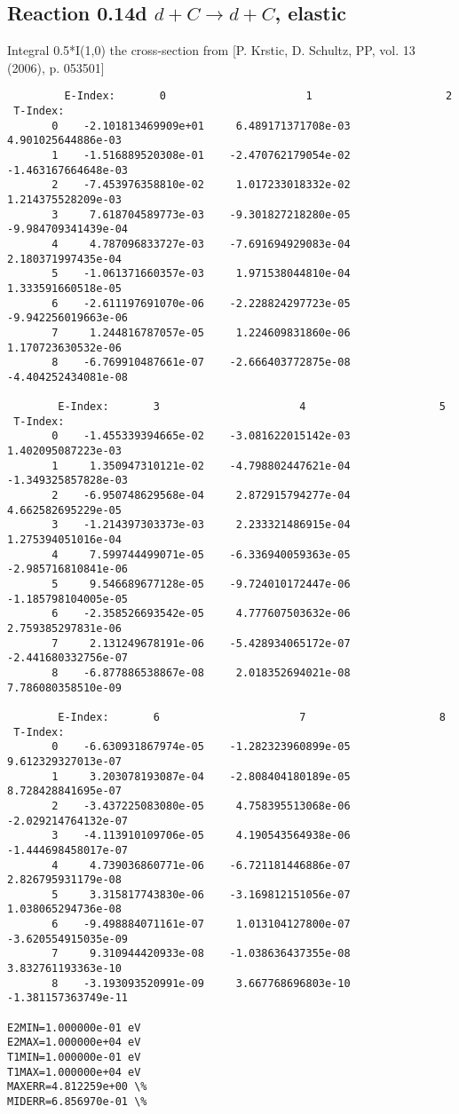 \documentclass[12pt,dvipdfmx]{article}
\begin{document}
\subsection{
Reaction 0.14d  $d + C \rightarrow d + C$, elastic}

Integral 0.5*I(1,0) the cross-section from [P. Krstic, D. Schultz, PP, vol. 13 (2006), p. 053501]

\begin{small}\begin{verbatim}
         E-Index:       0                      1                     2
 T-Index:
       0    -2.101813469909e+01     6.489171371708e-03     4.901025644886e-03
       1    -1.516889520308e-01    -2.470762179054e-02    -1.463167664648e-03
       2    -7.453976358810e-02     1.017233018332e-02     1.214375528209e-03
       3     7.618704589773e-03    -9.301827218280e-05    -9.984709341439e-04
       4     4.787096833727e-03    -7.691694929083e-04     2.180371997435e-04
       5    -1.061371660357e-03     1.971538044810e-04     1.333591660518e-05
       6    -2.611197691070e-06    -2.228824297723e-05    -9.942256019663e-06
       7     1.244816787057e-05     1.224609831860e-06     1.170723630532e-06
       8    -6.769910487661e-07    -2.666403772875e-08    -4.404252434081e-08

        E-Index:       3                      4                     5
 T-Index:
       0    -1.455339394665e-02    -3.081622015142e-03     1.402095087223e-03
       1     1.350947310121e-02    -4.798802447621e-04    -1.349325857828e-03
       2    -6.950748629568e-04     2.872915794277e-04     4.662582695229e-05
       3    -1.214397303373e-03     2.233321486915e-04     1.275394051016e-04
       4     7.599744499071e-05    -6.336940059363e-05    -2.985716810841e-06
       5     9.546689677128e-05    -9.724010172447e-06    -1.185798104005e-05
       6    -2.358526693542e-05     4.777607503632e-06     2.759385297831e-06
       7     2.131249678191e-06    -5.428934065172e-07    -2.441680332756e-07
       8    -6.877886538867e-08     2.018352694021e-08     7.786080358510e-09

        E-Index:       6                      7                     8
 T-Index:
       0    -6.630931867974e-05    -1.282323960899e-05     9.612329327013e-07
       1     3.203078193087e-04    -2.808404180189e-05     8.728428841695e-07
       2    -3.437225083080e-05     4.758395513068e-06    -2.029214764132e-07
       3    -4.113910109706e-05     4.190543564938e-06    -1.444698458017e-07
       4     4.739036860771e-06    -6.721181446886e-07     2.826795931179e-08
       5     3.315817743830e-06    -3.169812151056e-07     1.038065294736e-08
       6    -9.498884071161e-07     1.013104127800e-07    -3.620554915035e-09
       7     9.310944420933e-08    -1.038636437355e-08     3.832761193363e-10
       8    -3.193093520991e-09     3.667768696803e-10    -1.381157363749e-11

E2MIN=1.000000e-01 eV
E2MAX=1.000000e+04 eV
T1MIN=1.000000e-01 eV
T1MAX=1.000000e+04 eV
MAXERR=4.812259e+00 \%
MIDERR=6.856970e-01 \%
\end{verbatim}\end{small}
\newpage
\end{document}

